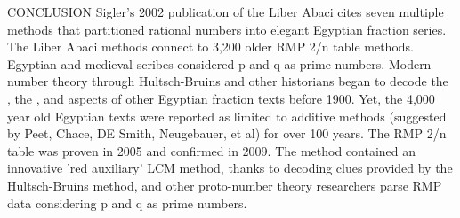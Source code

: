 \documentclass[12pt]{article}
\begin{document}
CONCLUSION Sigler's 2002 publication of the Liber Abaci cites seven multiple methods that partitioned rational numbers into elegant Egyptian fraction series. The Liber Abaci methods connect to 3,200 older RMP 2/n table methods. Egyptian and medieval scribes considered p and q as prime numbers. Modern number theory through Hultsch-Bruins and other historians began to decode the , the , and aspects of other Egyptian fraction texts before 1900. Yet, the 4,000 year old Egyptian texts were reported as limited to additive methods (suggested by Peet, Chace, DE Smith, Neugebauer, et al) for over 100 years. The RMP 2/n table was proven in 2005 and confirmed in 2009. The method contained an innovative 'red auxiliary' LCM method, thanks to decoding clues provided by the Hultsch-Bruins method, and other proto-number theory researchers parse RMP data considering p and q as prime numbers.

\end{document}
